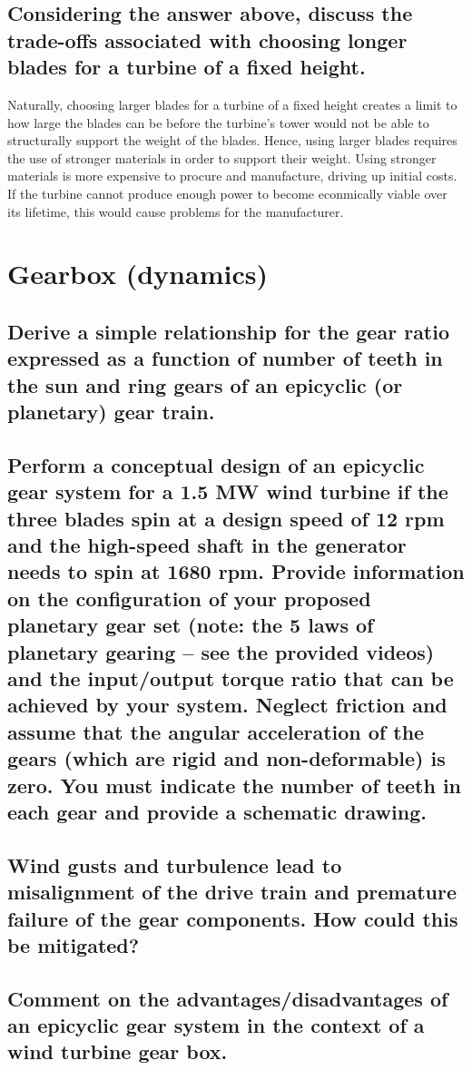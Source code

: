 \documentclass[12pt]{article}
\begin{document}
\begin{flushleft}
\subsection{Considering the answer above, discuss the trade-offs associated with choosing longer blades for a turbine of a fixed height.}
Naturally, choosing larger blades for a turbine of a fixed height creates a limit to how large the blades can be before the turbine's tower would not be able to structurally support the weight of the blades. Hence, using larger blades requires the use of stronger materials in order to support their weight. Using stronger materials is more expensive to procure and manufacture, driving up initial costs. If the turbine cannot produce enough power to become econmically viable over its lifetime, this would cause problems for the manufacturer.

\section{Gearbox (dynamics)}
\subsection{Derive a simple relationship for the gear ratio expressed as a function of number of teeth in the sun and ring gears of an epicyclic (or planetary) gear train.}
\subsection{Perform a conceptual design of an epicyclic gear system for a 1.5 MW wind turbine if the three blades spin at a design speed of 12 rpm and the high-speed shaft in the generator needs to spin at 1680 rpm. Provide information on the configuration of your proposed planetary gear set (note: the 5 laws of planetary gearing – see the provided videos) and the input/output torque ratio that can be achieved by your system. Neglect friction and assume that the angular acceleration of the gears (which are rigid and non-deformable) is zero. You must indicate the number of teeth in each gear and provide a schematic drawing.}
\subsection{Wind gusts and turbulence lead to misalignment of the drive train and premature failure of the gear components. How could this be mitigated?}
\subsection{Comment on the advantages/disadvantages of an epicyclic gear system in the context of a wind turbine gear box.}


\end{flushleft}
\end{document}
